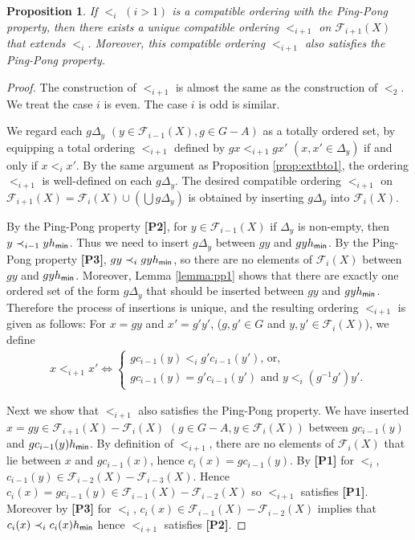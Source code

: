 \documentclass[10pt]{amsart}
\newtheorem{proposition}[theorem]{Proposition}
\numberwithin{equation}{section}
\begin{document}
\begin{proposition}
\label{prop:proof}
If $<_{i}$ $(i>1)$ is a compatible ordering with the Ping-Pong property, then there exists a unique compatible ordering $<_{i+1}$ on ${\mathcal{F}}_{i+1}(X)$ that extends $<_{i}$. Moreover, this compatible ordering $<_{i+1}$ also satisfies the Ping-Pong property.
\end{proposition}
\begin{proof}

The construction of $<_{i+1}$ is almost the same as the construction of $<_{2}$. We  treat the case $i$ is even. The case $i$ is odd is similar.

We regard each $g\Delta_{y}$ $(y \in {\mathcal{F}}_{i-1}(X), g\in G-A)$ as a totally ordered set, by equipping a total ordering $<_{i+1}$ defined by $gx <_{i+1} gx'$ $(x,x' \in \Delta_{y})$ if and only if $x<_{i}x'$. By the same argument as Proposition \ref{prop:extbto1}, the ordering $<_{i+1}$ is well-defined on each $g\Delta_{y}$.
The desired compatible ordering $<_{i+1}$ on ${\mathcal{F}}_{i+1}(X)={\mathcal{F}}_{i}(X) \cup \left( \bigcup g \Delta_{y}\right)$ is obtained by inserting $g\Delta_{y}$ into ${\mathcal{F}}_{i}(X)$.

By the Ping-Pong property {\bf [P2]}, for $y \in {\mathcal{F}}_{i-1}(X)$ if $\Delta_{y}$ is non-empty, then $y \prec_{i-1} yh_{\sf min}$. Thus we need to insert $g\Delta_{y}$ between $gy$ and $gyh_{\sf min}$. By the Ping-Pong property {\bf [P3]}, $gy \prec_{i} gyh_{\sf min}$, so there are no elements of ${\mathcal{F}}_{i}(X)$ between $gy$ and $gyh_{\sf min}$. Moreover, Lemma \ref{lemma:pp1} shows that there are exactly one ordered set of the form $g\Delta_{y}$ that should be inserted between $gy$ and $gyh_{\sf min}$. Therefore the process of insertions is unique, and the resulting ordering $<_{i+1}$ is given as follows: For $x=gy$ and $ x'=g'y'$, ($g,g' \in G$ and $y, y' \in {\mathcal{F}}_{i}(X)$), we define
\begin{gather}
\label{eqn:oi+1}
x <_{i+1} x' \iff 
\begin{cases}
gc_{i-1}(y) <_{i} g'c_{i-1}(y') \text{, or,}\\
gc_{i-1}(y)=g'c_{i-1}(y') \text{ and } y <_{i} (g^{-1}g')y'.
\end{cases}
\end{gather}

Next we show that $<_{i+1}$ also satisfies the Ping-Pong property. We have inserted $x=gy \in {\mathcal{F}}_{i+1}(X)-{\mathcal{F}}_{i}(X)$ $(g\in G-A, y \in {\mathcal{F}}_{i}(X))$ between $gc_{i-1}(y)$ and $gc_{i-1}(y)h_{\sf min}$. By definition of $<_{i+1}$, there are no elements of ${\mathcal{F}}_{i}(X)$ that lie between $x$ and $gc_{i-1}(x)$, hence $c_{i}(x)=gc_{i-1}(y)$.
By {\bf [P1]} for $<_{i}$, $c_{i-1}(y) \in {\mathcal{F}}_{i-2}(X)-{\mathcal{F}}_{i-3}(X)$. Hence $c_{i}(x) = gc_{i-1}(y) \in {\mathcal{F}}_{i-1}(X)-{\mathcal{F}}_{i-2}(X)$ so $<_{i+1}$ satisfies {\bf [P1]}.
Moreover by {\bf [P3]} for $<_{i}$, $c_{i}(x) \in {\mathcal{F}}_{i-1}(X)-{\mathcal{F}}_{i-2}(X)$ implies that $c_{i}(x) \prec_{i} c_{i}(x)h_{\sf min}$ hence $<_{i+1}$ satisfies {\bf [P2]}.
 


\end{proof}
\end{document}

